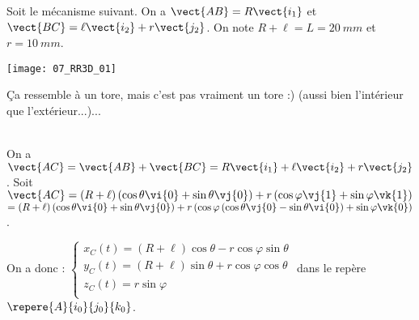 \normalfalse \difficiletrue \tdifficilefalse
\correctiontrue


\setcounter{question}{0}
\ifcorrection
\else
{}
\fi

\ifprof
\else
Soit le mécanisme suivant. On a $\vect{AB}=R\vect{i_1}$ et $\vect{BC}=\ell\vect{i_2}+r\vect{j_2}$. On note $R+\ell=L = \SI{20}{mm}$ et $r=\SI{10}{mm}$.
\begin{center}
\texttt{[image: 07\_RR3D\_01]}
\end{center}
\fi


\ifprof
\else
{}
\fi

\ifprof
Ça ressemble à un tore, mais c'est pas vraiment un tore :) (aussi bien l'intérieur que l'extérieur...)...
\else
\fi

\ifprof ~\\
On a $\vect{AC}=\vect{AB}+\vect{BC} = R\vect{i_1} + \ell\vect{i_2}+r\vect{j_2}$. 
Soit $\vect{AC} = \left(R+\ell\right)\left(\cos\theta\vi{0} + \sin\theta\vj{0}\right)  + r\left(\cos\varphi \vj{1}+\sin\varphi \vk{1}\right)$  $= \left(R+\ell\right)\left(\cos\theta\vi{0} + \sin\theta\vj{0}\right)  + r\left(\cos\varphi \left(  \cos\theta\vj{0} - \sin\theta\vi{0}\right)+\sin\varphi \vk{0}\right)$.

On a donc :
$\left\{
\begin{array}{l}
x_C(t)= \left(R+\ell\right)\cos\theta  - r\cos\varphi  \sin\theta\\
y_C(t)= \left(R+\ell\right)\sin\theta  + r\cos\varphi \cos\theta \\
z_C(t)=  r\sin\varphi \\
\end{array}
\right.
$ dans le repère $\repere{A}{i_0}{j_0}{k_0}$.
\else
\fi

